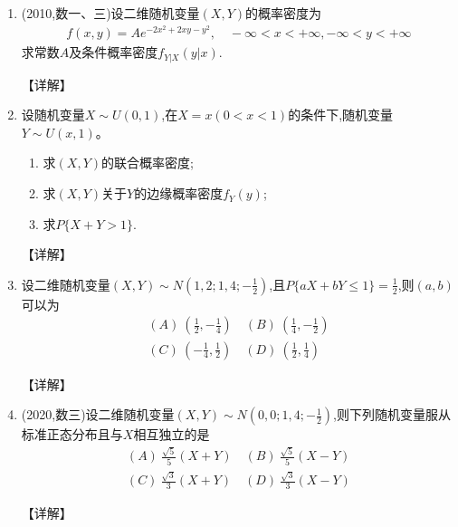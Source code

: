 \documentclass[12pt, a4paper, oneside, UTF8]{ctexbook}
\begin{document}
\begin{enumerate}[label=\arabic*.,start=4]
    \item (2010,数一、三)设二维随机变量$(X,Y)$的概率密度为
    \begin{align*}
        f(x,y)=Ae^{-2x^2+2xy-y^2}, \quad -\infty<x<+\infty, -\infty<y<+\infty
    \end{align*}
    求常数$A$及条件概率密度$f_{Y|X}(y|x)$.
    
    \begin{solution}
    【详解】
    \end{solution}
    
    \item 设随机变量$X\sim U(0,1)$,在$X=x(0<x<1)$的条件下,随机变量$Y\sim U(x,1)$。
    \begin{enumerate}
        \item 求$(X,Y)$的联合概率密度;
        \item 求$(X,Y)$关于$Y$的边缘概率密度$f_Y(y)$;
        \item 求$P\{X+Y>1\}$.
    \end{enumerate}
    
    \begin{solution}
    【详解】
    \end{solution}
    
    \item 设二维随机变量$(X,Y)\sim N(1,2;1,4;-\frac{1}{2})$,且$P\{aX+bY\leq 1\}=\frac{1}{2}$,则$(a,b)$可以为
    \begin{align*}
        (A)\ \left(\frac{1}{2},-\frac{1}{4}\right) \quad (B)\ \left(\frac{1}{4},-\frac{1}{2}\right) \\
        (C)\ \left(-\frac{1}{4},\frac{1}{2}\right) \quad (D)\ \left(\frac{1}{2},\frac{1}{4}\right)
    \end{align*}
    
    \begin{solution}
    【详解】
    \end{solution}
    
    \item (2020,数三)设二维随机变量$(X,Y)\sim N(0,0;1,4;-\frac{1}{2})$,则下列随机变量服从标准正态分布且与$X$相互独立的是
    \begin{align*}
        (A)\ \frac{\sqrt{5}}{5}(X+Y) \quad (B)\ \frac{\sqrt{5}}{5}(X-Y) \\
        (C)\ \frac{\sqrt{3}}{3}(X+Y) \quad (D)\ \frac{\sqrt{3}}{3}(X-Y)
    \end{align*}
    
    \begin{solution}
    【详解】
    \end{solution}
    

\end{enumerate}
\end{document}
